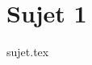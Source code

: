 \documentclass[a4paper, 11pt]{book}
\begin{document}

\resetQ
\chapter{Sujet 1}
{sujet.tex}
\end{document}
